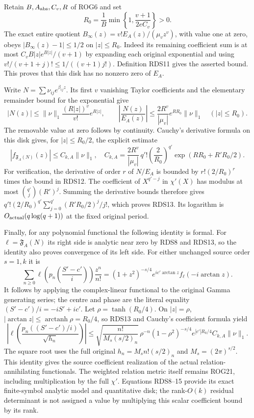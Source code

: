 \documentclass[11pt,a4paper]{article}
\begin{document}
Retain $B,A_{\rm abs},C_v,R$ of ROG6 and set
\[
 R_0=\frac1B\min\left\{1,\frac{v+1}{2eC_v}\right\}>0.
 \tag{RDS11}
\]
The exact entire quotient
$B_\infty(z)=v!E_A(z)/(\mu_vz^v)$, with value one at zero,
obeys $|B_\infty(z)-1|\le1/2$ on $|z|\le R_0$.
Indeed its remaining coefficient sum is at most
$C_vB|z|e^{B|z|}/(v+1)$ by expanding each original
exponential and using
$v!/(v+1+j)!\le1/((v+1)j!)$. Definition RDS11 gives
the asserted bound. This proves that this disk has no
nonzero zero of $E_A$.

Write $N=\sum\nu_{ij}e^{\beta_{ij}z}$. Its first $v$
vanishing Taylor coefficients and the elementary remainder
bound for the exponential give
\[
 |N(z)|\le\|\nu\|_1\frac{(R|z|)^v}{v!}e^{R|z|},
 \qquad
 \left|\frac{N(z)}{E_A(z)}\right|
      \le\frac{2R^v}{|\mu_v|}e^{RR_0}\|\nu\|_1
                      \quad(|z|\le R_0).
 \tag{RDS12}
\]
The removable value at zero follows by continuity. Cauchy's
derivative formula on this disk gives, for $|z|\le R_0/2$,
the explicit estimate
\[
 |f_{\mathfrak F_A(N)}(z)|\le C_{k,A}\|\nu\|_1,
 \quad
 C_{k,A}=\frac{2R^v}{|\mu_v|}\,q'!
       \left(\frac2{R_0}\right)^{q'}
                    \exp(RR_0+R'R_0/2).
 \tag{RDS13}
\]
For verification, the derivative of order $r$ of $N/E_A$
is bounded by $r!(2/R_0)^r$ times the bound in RDS12.
The coefficient of $X^{q'-j}$ in $\chi'(X)$ has modulus
at most $\binom{q'}j(R')^j$. Summing the derivative bounds
therefore gives
$q'!(2/R_0)^{q'}\sum_{j=0}^{q'}(R'R_0/2)^j/j!$,
which proves RDS13. Its logarithm is
$O_{\rm actual}(q\log(q+1))$ at the fixed original period.

Finally, for any polynomial functional the following identity
is formal. For $\ell=\mathfrak F_A(N)$ its right side is
analytic near zero by RDS8 and RDS13, so the identity also
proves convergence of its left side. For either unchanged
source order $s=1,k$ it is
\[
 \sum_{n\ge0}\ell\left(p_n\left(\frac{S'-c'}i\right)\right)
                     \frac{z^n}{n!}
  =(1+z^2)^{-s/4}e^{ic'\arctan z}f_\ell(-i\arctan z).
 \tag{RDS14}
\]
It follows by applying the complex-linear functional to the
original Gamma generating series; the centre and phase are
the literal equality $(S'-c')/i=-iS'+ic'$. Let
$\rho=\tanh(R_0/4)$. On $|z|=\rho$,
$|\arctan z|\le\operatorname{arctanh}\rho=R_0/4$,
so RDS13 and Cauchy's coefficient formula yield
\[
 \left|\ell\left(\frac{p_n((S'-c')/i)}{\sqrt{h_n}}\right)\right|
 \le\sqrt{\frac{n!}{M_s(s/2)_n}}\,\rho^{-n}
       (1-\rho^2)^{-s/4}e^{|c'|R_0/4}C_{k,A}\|\nu\|_1.
 \tag{RDS15}
\]
The square root uses the full original
$h_n=M_sn!(s/2)_n$ and $M_s=(2\pi)^{s/2}$.
This identity gives the source coefficient realization of the
actual relation-annihilating functionals. The weighted relation
metric itself remains ROG21, including multiplication by
the full $\chi'$. Equations RDS8--15 provide its exact
finite-symbol analytic model and quantitative disk; the
rank-$O(k)$ residual determinant is not assigned a value by
multiplying this scalar coefficient bound by its rank.
\end{document}

